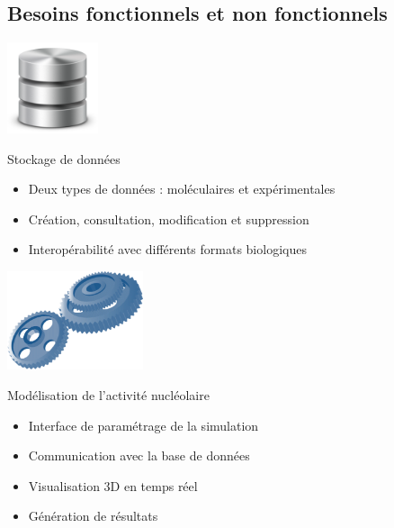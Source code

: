 \documentclass{beamer}
\begin{document}
\subsection{Besoins fonctionnels et non fonctionnels}

\begin{frame}
  \begin{center}
    \includegraphics[width=0.2\textwidth]{img/db.png}
  \end{center}
  
  \bigskip  
  
  \begin{block}{Stockage de données}
    \begin{itemize}
    \item Deux types de données : moléculaires et expérimentales
    \item Création, consultation, modification et suppression
    \item Interopérabilité avec différents formats biologiques
    \end{itemize}
  \end{block}
\end{frame}

\begin{frame}
  \begin{center}
    \includegraphics[width=0.3\textwidth]{img/rouages.png}
  \end{center}
  
  \bigskip  
  
  \begin{block}{Modélisation de l'activité nucléolaire}
    \begin{itemize}
    \item Interface de paramétrage de la simulation
    \item Communication avec la base de données
    \item Visualisation 3D en temps réel
    \item Génération de résultats
    \end{itemize}
  \end{block}

\end{frame}
\end{document}

